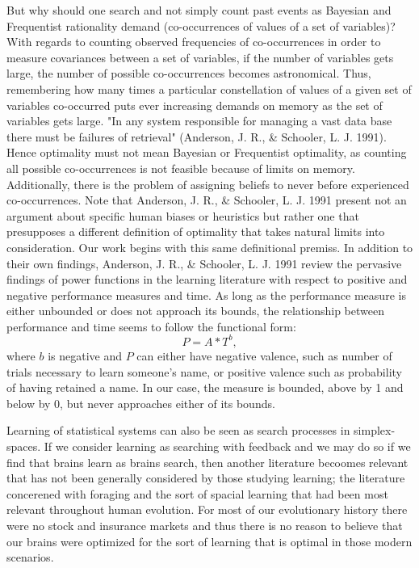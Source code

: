 But why should one search and not simply count past events as Bayesian and Frequentist rationality demand (co-occurrences of values of a set of variables)?  With regards to counting observed frequencies of co-occurrences in order to measure covariances between a set of variables, if the number of variables gets large, the number of possible co-occurrences becomes astronomical.  Thus, remembering how many times a particular constellation of values of a given set of variables co-occurred puts ever increasing demands on memory as the set of variables gets large.  "In any system responsible for managing a vast data base there must be failures of retrieval" (Anderson, J. R., \& Schooler, L. J. 1991).  Hence optimality must not mean Bayesian or Frequentist optimality, as counting all possible co-occurrences is not feasible because of limits on memory.  Additionally, there is the problem of assigning beliefs to never before experienced co-occurrences.  Note that Anderson, J. R., \& Schooler, L. J. 1991 present not an argument about specific human biases or heuristics but rather one that presupposes a different definition of optimality that takes natural limits into consideration.  Our work begins with this same definitional premiss.  In addition to their own findings, Anderson, J. R., \& Schooler, L. J. 1991 review the pervasive findings of power functions in the learning literature with respect to positive and negative performance measures and time.  As long as the performance measure is either unbounded or does not approach its bounds, the relationship between performance and time seems to follow the functional form:
$$P = A*T^{b},$$
where $b$ is negative and $P$ can either have negative valence, such as number of trials necessary to learn someone's name, or positive valence such as probability of having retained a name. In our case, the measure is bounded, above by 1 and below by 0, but never approaches either of its bounds. 

Learning of statistical systems can also be seen as search processes in simplex-spaces. If we consider learning as searching with feedback and we may do so if we find that brains learn as brains search, then another literature becoomes relevant that has not been generally considered by those studying learning; the literature concerened with foraging and the sort of spacial learning that had been most relevant throughout human evolution.  For most of our evolutionary history there were no stock and insurance markets and thus there is no reason to believe that our brains were optimized for the sort of learning that is optimal in those modern scenarios.      

